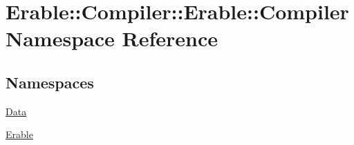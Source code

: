 \hypertarget{namespace_erable_1_1_compiler_1_1_erable_1_1_compiler}{}\section{Erable\+::Compiler\+::Erable\+::Compiler Namespace Reference}
\label{namespace_erable_1_1_compiler_1_1_erable_1_1_compiler}
\subsection*{Namespaces}
\begin{DoxyCompactItemize}
\item 
 \mbox{\hyperlink{namespace_erable_1_1_compiler_1_1_erable_1_1_compiler_1_1_data}{Data}}
\item 
 \mbox{\hyperlink{namespace_erable_1_1_compiler_1_1_erable_1_1_compiler_1_1_erable}{Erable}}
\end{DoxyCompactItemize}
